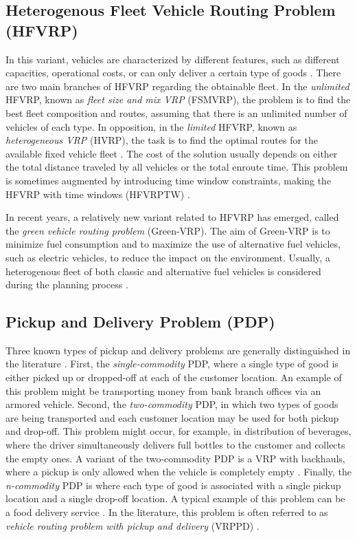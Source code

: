 \subsection{Heterogenous Fleet Vehicle Routing Problem (HFVRP)}

In this variant, vehicles are characterized by different features, such as different capacities, operational costs, or can only deliver a certain type of goods \cite{golden2008vrp, hvrp-2016, hvrp-2019}. There are two main branches of HFVRP regarding the obtainable fleet. In the \emph{unlimited} HFVRP, known as \emph{fleet size and mix VRP} (FSMVRP), the problem is to find the best fleet composition and routes, assuming that there is an unlimited number of vehicles of each type. In opposition, in the \emph{limited} HFVRP, known as \emph{heterogeneous VRP} (HVRP), the task is to find the optimal routes for the available fixed vehicle fleet \cite{hvrp-2019}. The cost of the solution usually depends on either the total distance traveled by all vehicles or the total enroute time. This problem is sometimes augmented by introducing time window constraints, making the HFVRP with time windows (HFVRPTW) \cite{hvrp-2016}.

In recent years, a relatively new variant related to HFVRP has emerged, called the \emph{green vehicle routing problem} (Green-VRP). The aim of Green-VRP is to minimize fuel consumption and to maximize the use of alternative fuel vehicles, such as electric vehicles, to reduce the impact on the environment. Usually, a heterogenous fleet of both classic and alternative fuel vehicles is considered during the planning process \cite{Asghari2021}.

\subsection{Pickup and Delivery Problem (PDP)}

Three known types of pickup and delivery problems are generally distinguished in the literature \cite{cordeau-2007-7, toth2015vrp}. First, the \emph{single-commodity} PDP, where a single type of good is either picked up or dropped-off at each of the customer location. An example of this problem might be transporting money from bank branch offices via an armored vehicle. Second, the \emph{two-commodity} PDP, in which two types of goods are being transported and each customer location may be used for both pickup and drop-off. This problem might occur, for example, in distribution of beverages, where the driver simultaneously delivers full bottles to the customer and collects the empty ones. A variant of the two-commodity PDP is a VRP with backhauls, where a pickup is only allowed when the vehicle is completely empty \cite{wrptw}. Finally, the \emph{n-commodity} PDP is where each type of good is associated with a single pickup location and a single drop-off location. A typical example of this problem can be a food delivery service \cite{cordeau-2007-7, 8541149, hvrp-2020}. In the literature, this problem is often referred to as \emph{vehicle routing problem with pickup and delivery} (VRPPD) \cite{cordeau-2007-7}.

